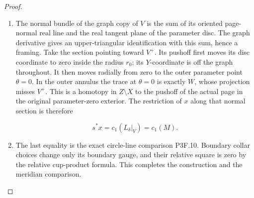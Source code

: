 \begin{proof}
\begin{enumerate}[label=\arabic*.]
\item The normal bundle of the graph copy of \(V\) is the sum of its
oriented page-normal real line and the real tangent plane of the
parameter disc.  The graph derivative gives an upper-triangular
identification with this sum, hence a framing.  Take the section
pointing toward \(V^+\).  Its pushoff first moves its disc coordinate
to zero inside the radius \(r_0\); its \(Y\)-coordinate is off the
graph throughout.  It then moves radially from zero to the outer
parameter point \(\theta=0\).  In the outer annulus the trace at
\(\theta=0\) is exactly \(W\), whose projection misses \(V^+\).
This is a homotopy in \(Z\setminus X\) to the pushoff of the actual
page in the original parameter-zero exterior.  The restriction of
\(x\) along that normal section is therefore

\[
 s^*x=c_1(L_\delta|_V)=c_1(M).
\]

\item The last equality is the exact circle-line comparison P3F.10.
Boundary collar choices change only its boundary gauge, and their
relative square is zero by the relative cup-product formula.
This completes the construction and the meridian comparison.

\end{enumerate}
\end{proof}